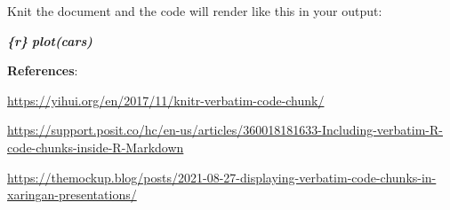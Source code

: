 \documentclass[
]{book}
\newenvironment{Shaded}{\begin{snugshade}}{\end{snugshade}}
\newcommand{\InformationTok}[1]{\textcolor[rgb]{0.56,0.35,0.01}{\textbf{\textit{#1}}}}
\begin{document}
Knit the document and the code will render like this in your output:

\begin{Shaded}
\begin{Highlighting}[]
\InformationTok{\textasciigrave{}\textasciigrave{}\textasciigrave{}\{r\}}
\InformationTok{plot(cars)}
\InformationTok{\textasciigrave{}\textasciigrave{}\textasciigrave{}}
\end{Highlighting}
\end{Shaded}

\textbf{References}:

\url{https://yihui.org/en/2017/11/knitr-verbatim-code-chunk/}

\url{https://support.posit.co/hc/en-us/articles/360018181633-Including-verbatim-R-code-chunks-inside-R-Markdown}

\url{https://themockup.blog/posts/2021-08-27-displaying-verbatim-code-chunks-in-xaringan-presentations/}

  
\end{document}
